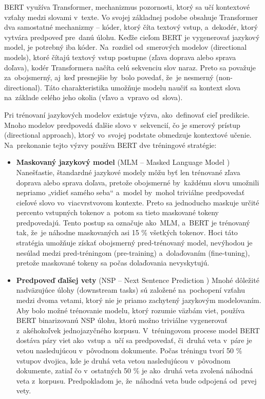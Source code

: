 BERT využíva Transformer, mechanizmus pozornosti, ktorý sa učí kontextové vzťahy medzi slovami  v~texte. Vo svojej základnej podobe obsahuje Transformer dva samostatné mechanizmy – kóder, ktorý číta textový vstup, a~dekodér, ktorý vytvára predpoveď pre~danú úlohu. Keďže cieľom BERT je vygenerovať jazykový model, je potrebný iba kóder. Na~rozdiel od~smerových modelov (directional models), ktoré čítajú textový vstup postupne (zľava doprava alebo sprava doľava), kodér Transformera načíta celú sekvenciu slov naraz. Preto sa považuje za~obojsmerný, aj~keď presnejšie by~bolo povedať, že~je nesmerný (non-directional). Táto charakteristika umožňuje modelu naučiť sa kontext slova na~základe celého jeho okolia (vľavo a~vpravo od~slova).

Pri trénovaní jazykových modelov existuje výzva, ako~definovať cieľ predikcie. Mnoho modelov predpovedá ďalšie slovo v~sekvencií, čo je smerový prístup (directional approach), ktorý vo~svojej podstate obmedzuje kontextové učenie. Na~prekonanie tejto výzvy používa BERT dve tréningové stratégie:
\begin{itemize}
    \item \textbf{Maskovaný jazykový model}  (MLM -- Masked Language Model )  Nanešťastie, štandardné  jazykové modely môžu byť len trénované zľava doprava alebo sprava doľava, pretože obojsmerné by~každému slovu umožnili nepriamo „vidieť samého seba“ a~model by~mohol triviálne predpovedať cieľové slovo vo~viacvrstvovom kontexte. Preto sa jednoducho maskuje určité percento vstupných tokenov a~potom sa tieto maskované tokeny predpovedajú. Tento postup sa označuje ako~MLM, a~BERT je trénovaný tak, že~je náhodne maskovaných asi 15 \% všetkých tokenov. Hoci táto stratégia umožňuje získať obojsmerný pred-trénovaný model, nevýhodou je nesúlad medzi pred-tréningom (pre-training) a~dolaďovaním (fine-tuning), pretože maskované tokeny sa počas dolaďovania nevyskytujú.
    
    \item \textbf{Predpoveď ďalšej vety} (NSP -- Next Sentence Prediction ) Mnohé dôležité nadväzujúce úlohy (downstream tasks) sú založené na~pochopení vzťahu medzi dvoma vetami, ktorý nie je priamo zachytený jazykovým modelovaním. Aby bolo možné trénovanie modelu, ktorý rozumie väzbám viet, používa BERT binarizovanú NSP úlohu, ktorú možno triviálne vygenerovať z~akéhokoľvek jednojazyčného korpusu. V~tréningovom procese model BERT dostáva páry viet ako~vstup a~učí sa predpovedať, či~druhá veta v~páre je vetou nasledujúcou v~pôvodnom dokumente. Počas tréningu tvorí 50 \% vstupov dvojica, kde je druhá veta vetou nasledujúcou v~pôvodnom dokumente, zatiaľ čo v~ostatných 50 \% je ako~druhá veta zvolená náhodná veta z~korpusu. Predpokladom je, že~náhodná veta bude odpojená od~prvej vety.
\end{itemize}

